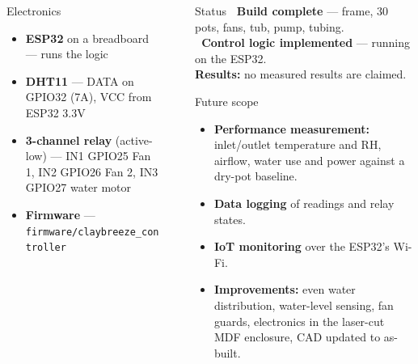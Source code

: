 \documentclass[final]{beamer}
\newlength{\sepwid}\setlength{\sepwid}{0.01\paperwidth}
\newlength{\thirdcolwid}\setlength{\thirdcolwid}{0.23\paperwidth}
\newlength{\lastcolwid}\setlength{\lastcolwid}{0.22\paperwidth}
\begin{document}
\begin{frame}[t]
\begin{columns}[t]
\begin{column}{\thirdcolwid}
\begin{block}{Electronics}
\begin{itemize}
\item \textbf{ESP32} on a breadboard --- runs the logic
\item \textbf{DHT11} --- DATA on GPIO32 (7A), VCC from ESP32 3.3V
\item \textbf{3-channel relay} (active-low) --- IN1 GPIO25 Fan 1, IN2 GPIO26 Fan 2, IN3 GPIO27 water motor
\item \textbf{Firmware} --- \texttt{firmware/claybreeze\_controller}
\end{itemize}
\end{block}

\end{column}

\begin{column}{\sepwid}\end{column}

\begin{column}{\lastcolwid}

\begin{alertblock}{Status}
\textcolor{cbok}{\textbf{\checkmark\ Build complete}} --- frame, 30 pots, fans, tub, pump, tubing.\\
\textcolor{cbok}{\textbf{\checkmark\ Control logic implemented}} --- running on the ESP32.\\[0.3em]
\textbf{Results:} no measured results are claimed.
\end{alertblock}

\begin{block}{Future scope}
\begin{itemize}
\item \textbf{Performance measurement:} inlet/outlet temperature and RH, airflow, water use and power against a dry-pot baseline.
\item \textbf{Data logging} of readings and relay states.
\item \textbf{IoT monitoring} over the ESP32's Wi-Fi.
\item \textbf{Improvements:} even water distribution, water-level sensing, fan guards, electronics in the laser-cut MDF enclosure, CAD updated to as-built.
\end{itemize}
\end{block}


\end{column}
\end{columns}
\end{frame}
\end{document}

